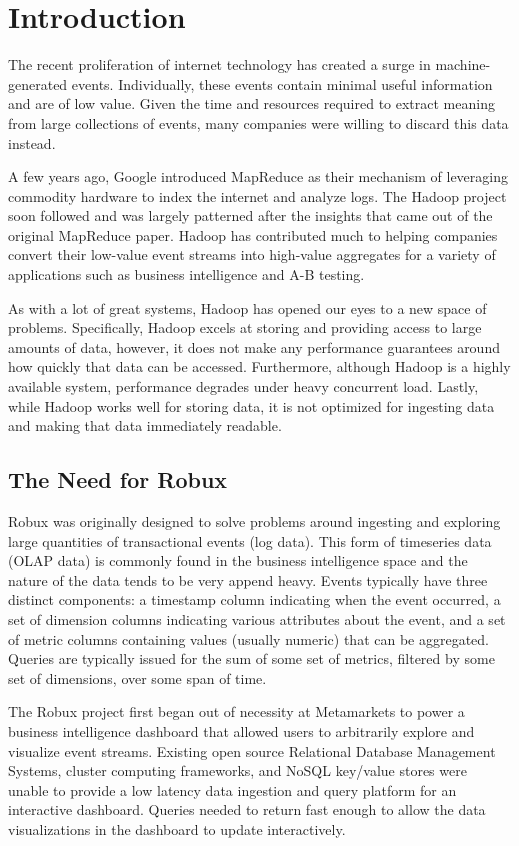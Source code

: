 \documentclass{vldb}
\begin{document}
\section{Introduction}
The recent proliferation of internet technology has created a surge
in machine-generated events.  Individually, these events contain minimal useful
information and are of low value.  Given the time and resources required to
extract meaning from large collections of events, many companies were willing
to discard this data instead.  

A few years ago, Google introduced MapReduce as their mechanism of leveraging
commodity hardware to index the internet and analyze logs.  The Hadoop project
soon followed and was largely patterned after the insights that came out of the
original MapReduce paper. Hadoop has contributed much to helping companies
convert their low-value event streams into high-value aggregates for a variety
of applications such as business intelligence and A-B testing.

As with a lot of great systems, Hadoop has opened our eyes to a new space of
problems.  Specifically, Hadoop excels at storing and providing access to large
amounts of data, however, it does not make any performance guarantees around
how quickly that data can be accessed.  Furthermore, although Hadoop is a
highly available system, performance degrades under heavy concurrent load.
Lastly, while Hadoop works well for storing data, it is not optimized for
ingesting data and making that data immediately readable.

\subsection{The Need for Robux}
Robux was originally designed to solve problems around ingesting and exploring
large quantities of transactional events (log data). This form of timeseries
data (OLAP data) is commonly found in the business intelligence
space and the nature of the data tends to be very append heavy. Events typically
have three distinct components: a timestamp column indicating when the event
occurred, a set of dimension columns indicating various attributes about the
event, and a set of metric columns containing values (usually numeric) that can
be aggregated. Queries are typically issued for the sum of some set of metrics,
filtered by some set of dimensions, over some span of time. 

The Robux project first began out of necessity at Metamarkets to power a
business intelligence dashboard that allowed users to arbitrarily explore and
visualize event streams. Existing open source Relational Database Management
Systems, cluster computing frameworks, and NoSQL key/value stores were unable
to provide a low latency data ingestion and query platform for an interactive
dashboard. Queries needed to return fast enough to allow the data
visualizations in the dashboard to update interactively.
\end{document}
